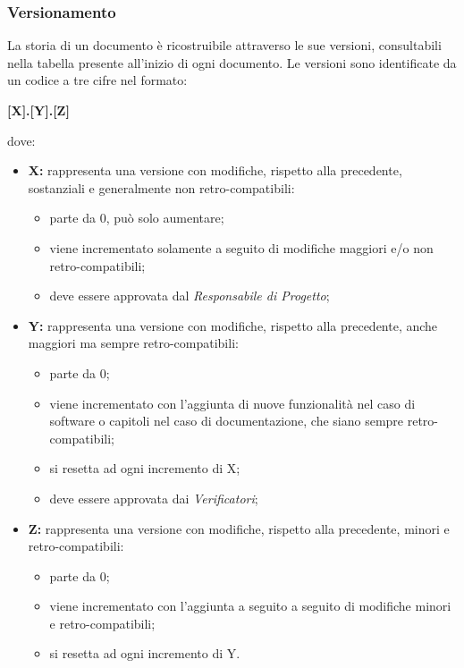 \subsubsection{Versionamento}
La storia di un documento è ricostruibile attraverso le sue versioni, consultabili nella tabella presente all'inizio di ogni documento. Le versioni sono identificate da un codice a tre cifre nel formato:
\begin{center}
    \textbf{\large [X].[Y].[Z]}\\
\end{center}
dove:
\begin{itemize}

    \item \textbf{\large X:} rappresenta una versione con modifiche, rispetto alla precedente, sostanziali e generalmente non retro-compatibili:
          \begin{itemize}
              \item parte da 0, può solo aumentare;
              \item viene incrementato solamente a seguito di modifiche maggiori e/o non retro-compatibili;
              \item deve essere approvata dal \textit{Responsabile di Progetto};
          \end{itemize}
    \item \textbf{\large Y:} rappresenta una versione con modifiche, rispetto alla precedente, anche maggiori ma sempre retro-compatibili:
          \begin{itemize}
              \item parte da 0;
              \item viene incrementato con l'aggiunta di nuove funzionalità nel caso di software o capitoli nel caso di documentazione, che siano sempre retro-compatibili;
              \item si resetta ad ogni incremento di X;
              \item deve essere approvata dai \textit{Verificatori};
          \end{itemize}
    \item \textbf{\large Z:} rappresenta una versione con modifiche, rispetto alla precedente, minori e retro-compatibili:
          \begin{itemize}
              \item parte da 0;
              \item viene incrementato con l'aggiunta a seguito a seguito di modifiche minori e retro-compatibili;
              \item si resetta ad ogni incremento di Y.
          \end{itemize}

\end{itemize}
